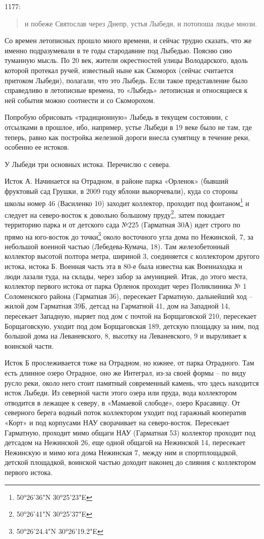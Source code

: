 1177:

\begin{quotation}
и побеже Святослав через Днепр, устья Лыбеди, и потопоша людье мнози.
\end{quotation}

Со времен летописных прошло много времени, и сейчас трудно сказать, что же именно подразумевали в те годы стародавние под Лыбедью. Поясню сию туманную мысль. По 20 век, жители окрестностей улицы Володарского, вдоль которой протекал ручей, известный ныне как Скоморох (сейчас считается притоком Лыбеди), полагали, что это Лыбедь. Если такое представление было справедливо в летописные времена, то «Лыбедь» летописная и относящиеся к ней события можно соотнести и со Скоморохом.

Попробую обрисовать «традиционную» Лыбедь в текущем состоянии, с отсылками в прошлое, ибо, например, устье Лыбеди в 19 веке было не там, где теперь, равно как постройка железной дороги внесла сумятицу в течение реки, особенно ее истоков.

У Лыбеди три основных истока. Перечислю с севера.

Исток А. Начинается на Отрадном, в районе парка «Орленок» (бывший фруктовый сад Грушки, в 2009 году яблони выкорчевали), куда со стороны школы номер 46 (Василенко 10) заходит коллектор, проходит под фонтаном\footnote{50°26'36"N 30°25'23"E} и следует на северо-восток к довольно большому пруду\footnote{50°26'41"N 30°25'37"E}, затем покидает территорию парка и от детского сада №225 (Гарматная 30А) идет строго по прямо на юго-восток до точки\footnote{50°26'24.4"N 30°26'19.2"E} около восточного угла дома по Нежинской, 7, за небольшой военной частью (Лебедева-Кумача, 18). Там железобетонный коллектор высотой полтора метра, шириной 3, соединяется с коллектором другого истока, истока Б. Военная часть эта в 80-е была известна как Военнаходка и люди лазали туда, на склады, через забор за амуницией. Итак, до этого места, коллектор первого истока от парка Орленок проходит через Поликлиника № 1 Соломенского района (Гарматная 36), пересекает Гарматную, дальнейший ход – жилой дом Гарматная 39Б, детсад на Гарматной 41, дом на Западной 14, пересекает Западную, ныряет под дом с почтой на Борщаговской 210, пересекает Борщаговскую, уходит под дом Борщаговская 189, детскую площадку за ним, под большой дома на Леваневского, 8, высотку на Леваневского, 9 и выруливает к воинской части.  

Исток Б прослеживается тоже на Отрадном, но южнее, от парка Отрадного. Там есть длинное озеро Отрадное, оно же Интеграл, из-за своей формы – по виду русло реки, около него стоит памятный современный камень, что здесь находится исток Лыбеди. Из северной части этого озера или пруда, вода коллектором отводится в лежащее к северу, в «Мамаевой слободе», озеро Красавицу. От северного берега водный поток коллектором уходит под гаражный кооператив «Корт» и под корпусами НАУ сворачивает на северо-восток. Пересекает Гарматную, проходит мимо общаги НАУ (Гарматная 53) коллектор проходит под детсадом на Нежинской 26, еще одной общагой на Нежинской 14, пересекает Нежинскую и мимо юга дома Нежинская 7, между ним и спортплощадкой, детской площадкой, воинской частью доходит наконец до слияния с коллектором первого истока.

